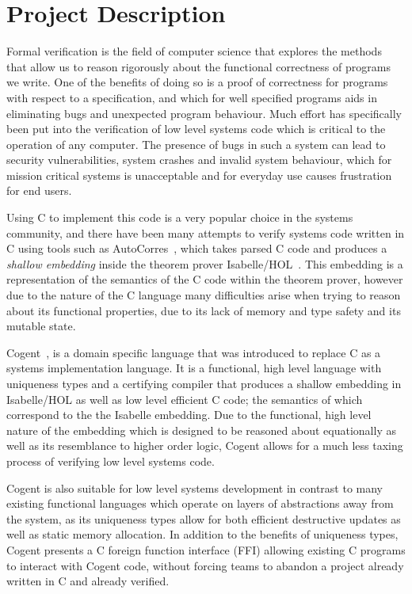 \chapter{Project Description}\label{ch:intro}


Formal verification is the field of computer science that explores the methods that allow us to
  reason rigorously about the functional correctness of programs we write.
One of the benefits of doing so is a proof of correctness for programs with respect to a specification,
  and which for well specified programs aids in eliminating bugs and unexpected program behaviour.
Much effort has specifically been put into the verification of low level systems code
  which is critical to the operation of any computer.
The presence of bugs in such a system can lead to security vulnerabilities,
  system crashes and invalid system behaviour, which for mission critical systems is unacceptable and
  for everyday use causes frustration for end users.

Using C to implement this code is a very popular choice in the systems community,
  and there have been many attempts to verify systems code written in C using tools such as 
  AutoCorres~\citep{AutoCorres}, which takes parsed C code and produces a \textit{shallow embedding}
  inside the theorem prover Isabelle/HOL~\cite{IsabelleTutorial}.
This embedding is a representation of the semantics of the C code within the theorem prover,
  however due to the nature of the C language many difficulties arise when trying to
  reason about its functional properties, due to its lack of memory and type safety 
  and its mutable state.

Cogent~\citep{ICFPCogent}, is a domain specific language that was introduced to replace C as a systems
  implementation language.
It is a functional, high level language with uniqueness types and a certifying compiler
  that produces a shallow embedding in Isabelle/HOL as well as low level efficient C code;
  the semantics of which correspond to the the Isabelle embedding.
Due to the functional, high level nature of the embedding 
  which is designed to be reasoned about equationally as well as its resemblance to higher order logic,
  Cogent allows for a much less taxing process of verifying low level systems code.

Cogent is also suitable for low level systems development in contrast to many existing functional languages which operate
  on layers of abstractions away from the system, as its uniqueness types allow for both efficient destructive updates
  as well as static memory allocation.
In addition to the benefits of uniqueness types, Cogent presents a C foreign function interface (FFI) allowing existing C programs
 to interact with Cogent code, without forcing teams to abandon a project already written in C and already verified.

